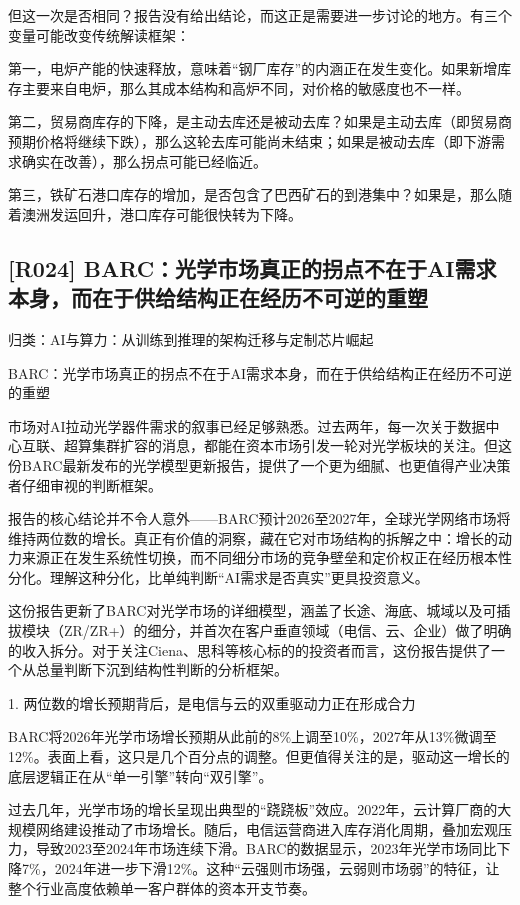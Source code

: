\documentclass[11pt]{ctexart}
\begin{document}
但这一次是否相同？报告没有给出结论，而这正是需要进一步讨论的地方。有三个变量可能改变传统解读框架：

第一，电炉产能的快速释放，意味着“钢厂库存”的内涵正在发生变化。如果新增库存主要来自电炉，那么其成本结构和高炉不同，对价格的敏感度也不一样。

第二，贸易商库存的下降，是主动去库还是被动去库？如果是主动去库（即贸易商预期价格将继续下跌），那么这轮去库可能尚未结束；如果是被动去库（即下游需求确实在改善），那么拐点可能已经临近。

第三，铁矿石港口库存的增加，是否包含了巴西矿石的到港集中？如果是，那么随着澳洲发运回升，港口库存可能很快转为下降。

\subsection{[R024] BARC：光学市场真正的拐点不在于AI需求本身，而在于供给结构正在经历不可逆的重塑}
{\small\color{refgray}归类：AI与算力：从训练到推理的架构迁移与定制芯片崛起}

BARC：光学市场真正的拐点不在于AI需求本身，而在于供给结构正在经历不可逆的重塑

市场对AI拉动光学器件需求的叙事已经足够熟悉。过去两年，每一次关于数据中心互联、超算集群扩容的消息，都能在资本市场引发一轮对光学板块的关注。但这份BARC最新发布的光学模型更新报告，提供了一个更为细腻、也更值得产业决策者仔细审视的判断框架。

报告的核心结论并不令人意外——BARC预计2026至2027年，全球光学网络市场将维持两位数的增长。真正有价值的洞察，藏在它对市场结构的拆解之中：增长的动力来源正在发生系统性切换，而不同细分市场的竞争壁垒和定价权正在经历根本性分化。理解这种分化，比单纯判断“AI需求是否真实”更具投资意义。

这份报告更新了BARC对光学市场的详细模型，涵盖了长途、海底、城域以及可插拔模块（ZR/ZR+）的细分，并首次在客户垂直领域（电信、云、企业）做了明确的收入拆分。对于关注Ciena、思科等核心标的的投资者而言，这份报告提供了一个从总量判断下沉到结构性判断的分析框架。

1. 两位数的增长预期背后，是电信与云的双重驱动力正在形成合力

BARC将2026年光学市场增长预期从此前的8\%上调至10\%，2027年从13\%微调至12\%。表面上看，这只是几个百分点的调整。但更值得关注的是，驱动这一增长的底层逻辑正在从“单一引擎”转向“双引擎”。

过去几年，光学市场的增长呈现出典型的“跷跷板”效应。2022年，云计算厂商的大规模网络建设推动了市场增长。随后，电信运营商进入库存消化周期，叠加宏观压力，导致2023至2024年市场连续下滑。BARC的数据显示，2023年光学市场同比下降7\%，2024年进一步下滑12\%。这种“云强则市场强，云弱则市场弱”的特征，让整个行业高度依赖单一客户群体的资本开支节奏。
\end{document}
